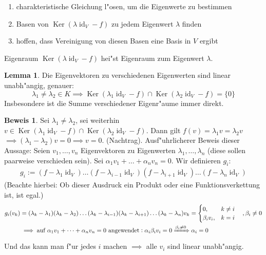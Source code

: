 \documentclass[oneside,fontsize=11pt,paper=a4,BCOR=0mm,DIV=12,automark,headsepline]{scrbook}
\DeclareMathOperator{\mKer}{Ker}
\DeclareMathOperator{\mId}{id}
\theoremstyle{remark}
\theoremstyle{definition}
\newtheorem{lemma}{Lemma}[section]
\theoremstyle{definition}
\newtheorem*{prof}{Beweis}
\theoremstyle{remark}
\begin{document}
\begin{enumerate}
\item charakteristische Gleichung l"osen, um die Eigenwerte zu bestimmen
\item Basen von \(\mKer(\lambda\mId_V-f)\) zu jedem Eigenwert \(\lambda\) finden
\item hoffen, dass Vereinigung von diesen Basen eine Basis in \(V\) ergibt
\end{enumerate}
\begin{definition}{Eigenraum}{}
  \(\mKer(\lambda\mId_V-f)\) hei"st Eigenraum zum Eigenwert \(\lambda\).
\end{definition}
\begin{lemma}
  Die Eigenvektoren zu verschiedenen Eigenwerten sind linear unabh"angig, genauer: \[\lambda_1\neq\lambda_2\in K\implies\mKer(\lambda_1\mId_V-f)\cap\mKer(\lambda_2\mId_V-f)=\{0\}\]
  Insbesondere ist die Summe verschiedener Eigenr"aume immer direkt.
\end{lemma}
\begin{prof}
  Sei \(\lambda_1\neq\lambda_2\), sei weiterhin \(v\in\mKer(\lambda_1\mId_V-f)\cap\mKer(\lambda_2\mId_V-f)\). Dann gilt \(f(v)=\lambda_1v=\lambda_2v\) \(\implies(\lambda_1-\lambda_2)v = 0\implies v = 0\).
  (Nachtrag). Ausf"uhrlicherer Beweis dieser Aussage: Seien \(v_1,\dots,v_n\) Eigenvektoren zu Eigenwerten \(\lambda_1,\dots,\lambda_n\) (diese sollen paarweise verschieden sein). Sei \(\alpha_1 v_1+\dots + \alpha_nv_n = 0\). Wir definieren \(g_i\):
  \begin{align*}
    g_i := (f-\lambda_1\mId_V)\dots(f-\lambda_{i-1}\mId_V)(f-\lambda_{i+1}\mId_V)\dots(f-\lambda_n\mId_V)
  \end{align*}
  (Beachte hierbei: Ob dieser Ausdruck ein Produkt oder eine Funktionsverkettung ist, ist egal.)
  \begin{align*}
    g_i(v_k) &= (\lambda_k-\lambda_1)(\lambda_k-\lambda_2)\dots(\lambda_k-\lambda_{i-1})(\lambda_k-\lambda_{i+1})\dots(\lambda_k-\lambda_n)v_k =
               \begin{cases}
                 0, & k\neq i \\
                 \beta_iv_i, & k = i
               \end{cases} \quad ,\beta_i\neq 0 \\
             &\implies \text{auf }\alpha_1v_1+\dots +\alpha_nv_n = 0\text{ angewendet}: \alpha_i\beta_iv_i = 0 \xRightarrow{\beta_i \neq 0} \alpha_i = 0
  \end{align*}
  Und das kann man f"ur jedes \(i\) machen \(\implies\) alle \(v_i\) sind linear unabh"angig.
\end{prof}
\end{document}
